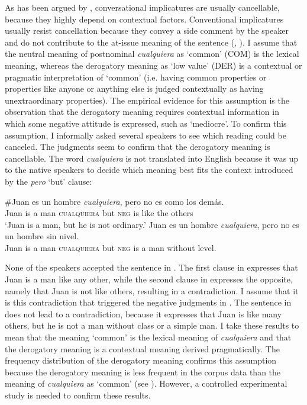 {{As has been argued by \citet{Grice1975}, conversational implicatures are usually cancellable, because they highly depend on contextual factors. Conventional implicatures usually resist cancellation because they convey a side comment by the speaker and do not contribute to the at-issue meaning of the sentence (\citealt{Potts2005}, \citealt{SimonsEtAl2010}).  I assume that the neutral meaning of postnominal \textit{cualquiera} as ‘common’ (COM) is the lexical meaning, whereas the derogatory meaning as ‘low value’ (DER) is a contextual or pragmatic interpretation of ‘common’ (i.e. having common properties or properties like anyone or anything else is judged contextually as having unextraordinary properties). The empirical evidence for this assumption is the observation that the derogatory meaning requires contextual information in which some negative attitude is expressed, such as ‘mediocre’. To confirm this assumption, I informally asked several speakers to see which reading could be canceled. The judgments seem to confirm that the derogatory meaning is cancellable. The word \textit{cualquiera} is not translated into English because it was up to the native speakers to decide which meaning best fits the context introduced by the \textit{pero} ‘but’ clause:}

\ea \label{bkm:Ref42976554} %
\ea  
\gll \#Juan es un hombre \textit{cualquiera}, pero no es como los demás.\\
{Juan} is a man \textsc{cualquiera} but \textsc{neg} is like the others\\
\glt ‘Juan is a man, but he is not ordinary.’
\ex \label{bkm:Ref42976554-2}
\gll Juan es un hombre \textit{cualquiera}, pero no es un hombre sin nivel.\\
Juan is a man \textsc{cualquiera} but \textsc{neg} is a man without level.\\
\z
\z

None of the speakers accepted the sentence in . The first clause in  expresses that Juan is a man like any other, while the second clause in  expresses the opposite, namely that Juan is not like others, resulting in a contradiction. {I assume that it is this contradiction that triggered the negative judgments in .} The sentence in  does not lead to a contradiction, because it expresses that Juan is like many others, but he is not a man without class or a simple man. I take these results to mean that the meaning ‘common’ is the lexical meaning of \textit{cualquiera} and that the derogatory meaning is a contextual meaning derived pragmatically. {The frequency distribution of the derogatory meaning confirms this assumption because the derogatory meaning is less frequent in the corpus data than the meaning of \textit{cualquiera} as ‘common’ (see ). However, a controlled experimental study is needed to confirm these results.}  

}
